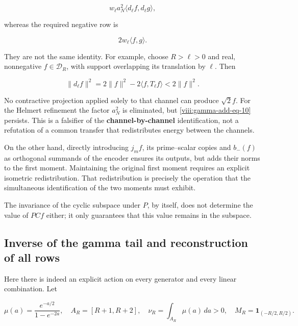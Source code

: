 \begin{equation}
w_\ell a_N^2\langle d_\ell f,d_\ell g\rangle,
\label{viii:gamma-add-display-22}
\end{equation}

whereas the required negative row is

\begin{equation}
2w_\ell\langle f,g\rangle.
\label{viii:gamma-add-display-23}
\end{equation}

They are not the same identity. For example, choose \(R>\ell>0\) and real, nonnegative \(f\in\mathcal D_R\), with support overlapping its translation by \(\ell\). Then

\begin{equation}
\|d_\ell f\|^2
=2\|f\|^2-2\langle f,T_\ell f\rangle
<2\|f\|^2.
\label{viii:gamma-add-eq-10}
\end{equation}

No contractive projection applied solely to that channel can produce \(\sqrt2f\). For the Helmert refinement the factor \(a_N^2\) is eliminated, but \eqref{viii:gamma-add-eq-10} persists. This is a falsifier of the \textbf{channel-by-channel} identification, not a refutation of a common transfer that redistributes energy between the channels.

On the other hand, directly introducing \(j_mf\), its prime--scalar copies and \(b_-(f)\) as orthogonal summands of the encoder ensures its outputs, but adds their norms to the first moment. Maintaining the original first moment requires an explicit isometric redistribution. That redistribution is precisely the operation that the simultaneous identification of the two moments must exhibit.

The invariance of the cyclic subspace under \(P\), by itself, does not determine the value of \(PCf\) either; it only guarantees that this value remains in the subspace.

\subsection{Inverse of the gamma tail and reconstruction of all rows}
\label{viii:gamma-add-sub-288}

Here there is indeed an explicit action on every generator and every linear combination. Let

\begin{equation}
\mu(a)=\frac{e^{-a/2}}{1-e^{-2a}},\quad
A_R=[R+1,R+2],\quad \nu_R=\int_{A_R}\mu(a)\,da>0,
\quad M_R=\mathbf1_{(-R/2,R/2)}.
\label{viii:gamma-add-display-25}
\end{equation}

